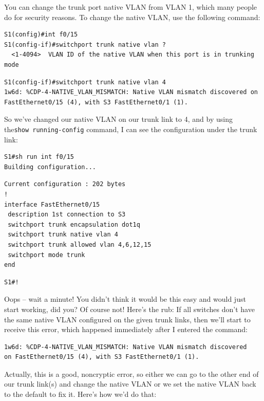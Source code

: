 You can change the trunk port native VLAN from VLAN 1, which many people
do for security reasons. To change the native VLAN, use the following
command:

\begin{verbatim}
S1(config)#int f0/15
S1(config-if)#switchport trunk native vlan ?
  <1-4094>  VLAN ID of the native VLAN when this port is in trunking mode
\end{verbatim}

\begin{verbatim}
S1(config-if)#switchport trunk native vlan 4
1w6d: %CDP-4-NATIVE_VLAN_MISMATCH: Native VLAN mismatch discovered on FastEthernet0/15 (4), with S3 FastEthernet0/1 (1).
\end{verbatim}

So we've changed our native VLAN on our trunk link to 4, and by using
the\texttt{show\ running-config} command, I can see the configuration
under the trunk link:

\begin{verbatim}
S1#sh run int f0/15
Building configuration...
\end{verbatim}

\begin{verbatim}
Current configuration : 202 bytes
!
interface FastEthernet0/15
 description 1st connection to S3
 switchport trunk encapsulation dot1q
 switchport trunk native vlan 4
 switchport trunk allowed vlan 4,6,12,15
 switchport mode trunk
end
\end{verbatim}

\begin{verbatim}
S1#!
\end{verbatim}

Oops -- wait a minute! You didn't think it would be this easy and would
just start working, did you? Of course not! Here's the rub: If all
switches don't have the same native VLAN configured on the given trunk
links, then we'll start to receive this error, which happened
immediately after I entered the command:

\begin{verbatim}
1w6d: %CDP-4-NATIVE_VLAN_MISMATCH: Native VLAN mismatch discovered
on FastEthernet0/15 (4), with S3 FastEthernet0/1 (1).
\end{verbatim}

Actually, this is a good, noncryptic error, so either we can go to the
other end of our trunk link(s) and change the native VLAN or we set the
native VLAN back to the default to fix it. Here's how we'd do that:


